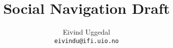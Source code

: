 \documentclass[11pt,a4paper,twoside]{book}
\title{Social Navigation Draft}
\author{Eivind Uggedal\\
        \texttt{eivindu@ifi.uio.no}\\\\
        }
\begin{document}
  \frontmatter
    \maketitle
    \tableofcontents
  \mainmatter
    

    \begin{appendices}
      
      
    \end{appendices}
  \backmatter
\end{document}
